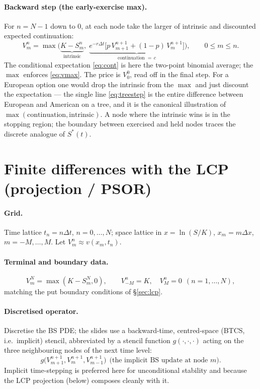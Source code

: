 \documentclass[11pt]{article}
\begin{document}
\paragraph{Backward step (the early-exercise max).} For $n=N-1$ down to $0$, at each node take the larger of
intrinsic and discounted expected continuation:
\begin{equation}\label{eq:treestep}
V_m^n=\max\!\Big(\underbrace{K-S_m^n}_{\text{intrinsic}},\;
\underbrace{e^{-r\Delta t}\big[p\,V_{m+1}^{n+1}+(1-p)\,V_m^{n+1}\big]}_{\text{continuation }=\,c}\Big),
\qquad 0\le m\le n.
\end{equation}
The conditional expectation \eqref{eq:cont} is here the two-point binomial average; the $\max$ enforces
\eqref{eq:vmax}. The price is $V_0^0$, read off in the final step. For a European option one would drop the
intrinsic from the $\max$ and just discount the expectation --- the single line \eqref{eq:treestep} is the
entire difference between European and American on a tree, and it is the canonical illustration of
$\max(\text{continuation},\text{intrinsic})$. A node where the intrinsic wins is in the stopping region; the
boundary between exercised and held nodes traces the discrete analogue of $S^\ast(t)$.

\section{Finite differences with the LCP (projection / PSOR)}\label{sec:fd}

\paragraph{Grid.} Time lattice $t_n=n\Delta t$, $n=0,\dots,N$; space lattice in $x=\ln(S/K)$,
$x_m=m\Delta x$, $m=-M,\dots,M$. Let $V_m^n\approx v(x_m,t_n)$.

\paragraph{Terminal and boundary data.}
\begin{equation}
V_m^N=\max(K-S_m^N,0),\qquad V_{-M}^n=K,\quad V_M^n=0\ \ (n=1,\dots,N),
\end{equation}
matching the put boundary conditions of \S\ref{sec:lcp}.

\paragraph{Discretised operator.} Discretise the BS PDE; the slides use a backward-time, centred-space (BTCS,
i.e.\ implicit) stencil, abbreviated by a stencil function $g(\cdot,\cdot,\cdot)$ acting on the three
neighbouring nodes of the next time level:
\begin{equation}\label{eq:stencil}
g\big(V_{m+1}^{n+1},V_m^{n+1},V_{m-1}^{n+1}\big)\ \ \text{(the implicit BS update at node }m).
\end{equation}
Implicit time-stepping is preferred here for unconditional stability and because the LCP projection (below)
composes cleanly with it.
\end{document}
